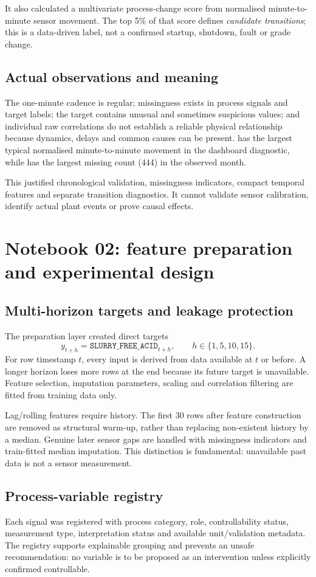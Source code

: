 \documentclass[10pt,a4paper]{article}
\begin{document}
It also calculated a multivariate process-change score from normalised minute-to-minute sensor movement. The top 5\% of that score defines \emph{candidate transitions}; this is a data-driven label, not a confirmed startup, shutdown, fault or grade change.

\subsection{Actual observations and meaning}
The one-minute cadence is regular; missingness exists in process signals and target labels; the target contains unusual and sometimes suspicious values; and individual raw correlations do not establish a reliable physical relationship because dynamics, delays and common causes can be present.  has the largest typical normalised minute-to-minute movement in the dashboard diagnostic, while  has the largest missing count (444) in the observed month.

This justified chronological validation, missingness indicators, compact temporal features and separate transition diagnostics. It cannot validate sensor calibration, identify actual plant events or prove causal effects.

\section{Notebook 02: feature preparation and experimental design}
\subsection{Multi-horizon targets and leakage protection}
The preparation layer created direct targets
\[
y_{t+h}=\texttt{SLURRY\_FREE\_ACID}_{t+h},\qquad h\in\{1,5,10,15\}.
\]
For row timestamp $t$, every input is derived from data available at $t$ or before. A longer horizon loses more rows at the end because its future target is unavailable. Feature selection, imputation parameters, scaling and correlation filtering are fitted from training data only.

Lag/rolling features require history. The first 30 rows after feature construction are removed as structural warm-up, rather than replacing non-existent history by a median. Genuine later sensor gaps are handled with missingness indicators and train-fitted median imputation. This distinction is fundamental: unavailable past data is not a sensor measurement.

\subsection{Process-variable registry}
Each signal was registered with process category, role, controllability status, measurement type, interpretation status and available unit/validation metadata. The registry supports explainable grouping and prevents an unsafe recommendation: no variable is to be proposed as an intervention unless explicitly confirmed controllable.
\end{document}
